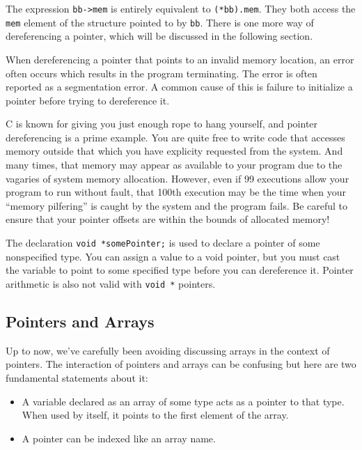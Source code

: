 The expression \texttt{bb-\textgreater{}mem} is entirely equivalent to
\texttt{(*bb).mem}. They both access the \texttt{mem} element of the structure
pointed to by \texttt{bb}. There is one more way of dereferencing a pointer,
which will be discussed in the following section.

When dereferencing a pointer that points to an invalid memory location, an
error often occurs which results in the program terminating. The error is often
reported as a segmentation error. A common cause of this is failure to
initialize a pointer before trying to dereference it.

C is known for giving you just enough rope to hang yourself, and pointer
dereferencing is a prime example. You are quite free to write code that
accesses memory outside that which you have explicity requested from the
system. And many times, that memory may appear as available to your program due
to the vagaries of system memory allocation. However, even if 99 executions
allow your program to run without fault, that 100th execution may be the time
when your ``memory pilfering'' is caught by the system and the program fails.
Be careful to ensure that your pointer offsets are within the bounds of
allocated memory!

The declaration \texttt{void *somePointer;} is used to declare a pointer of
some nonspecified type. You can assign a value to a void pointer, but you must
cast the variable to point to some specified type before you can dereference
it. Pointer arithmetic is also not valid with \texttt{void *} pointers.

\subsection{Pointers and Arrays}
Up to now, we've carefully been avoiding discussing arrays in the context of
pointers. The interaction of pointers and arrays can be confusing but here are
two fundamental statements about it:
\begin{itemize}
	\item A variable declared as an array of some type acts as a pointer to
that type. When used by itself, it points to the first element of the array.
	\item A pointer can be indexed like an array name.
\end{itemize}

